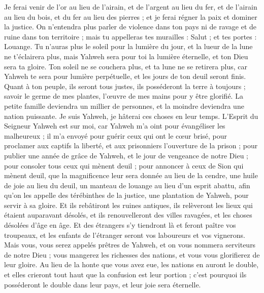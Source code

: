 \begin{multicols}{2}
Je ferai venir de l'or au lieu de l'airain, et de l'argent au lieu du fer, et de l'airain au lieu du bois, et du fer au lieu des pierres ; et je ferai régner la paix et dominer la justice.
On n'entendra plus parler de violence dans ton pays ni de ravage et de ruine dans ton territoire ; mais tu appelleras tes murailles : Salut ; et tes portes : Louange.
Tu n'auras plus le soleil pour la lumière du jour, et la lueur de la lune ne t'éclairera plus, mais Yahweh sera pour toi la lumière éternelle, et ton Dieu sera ta gloire.
Ton soleil ne se couchera plus, et ta lune ne se retirera plus, car Yahweh te sera pour lumière perpétuelle, et les jours de ton deuil seront finis.
Quant à ton peuple, ils seront tous justes, ils posséderont la terre à toujours ; savoir le germe de mes plantes, l'œuvre de mes mains pour y être glorifié.
La petite famille deviendra un millier de personnes, et la moindre deviendra une nation puissante. Je suis Yahweh, je hâterai ces choses en leur temps.
\VerseOne{}L'Esprit du Seigneur Yahweh est sur moi, car Yahweh m'a oint pour évangéliser les malheureux ; il m'a envoyé pour guérir ceux qui ont le cœur brisé, pour proclamer aux captifs la liberté, et aux prisonniers l'ouverture de la prison ;
pour publier une année de grâce de Yahweh, et le jour de vengeance de notre Dieu ; pour consoler tous ceux qui mènent deuil ;
pour annoncer à ceux de Sion qui mènent deuil, que la magnificence leur sera donnée au lieu de la cendre, une huile de joie au lieu du deuil, un manteau de louange au lieu d'un esprit abattu, afin qu'on les appelle des térébinthes de la justice, une plantation de Yahweh, pour servir à sa gloire.
Et ils rebâtiront les ruines antiques, ils relèveront les lieux qui étaient auparavant désolés, et ils renouvelleront des villes ravagées, et les choses désolées d'âge en âge.
Et des étrangers s'y tiendront là et feront paître vos troupeaux, et les enfants de l'étranger seront vos laboureurs et vos vignerons.
Mais vous, vous serez appelés prêtres de Yahweh, et on vous nommera serviteurs de notre Dieu ; vous mangerez les richesses des nations, et vous vous glorifierez de leur gloire.
Au lieu de la honte que vous avez eue, les nations en auront le double, et elles crieront tout haut que la confusion est leur portion ; c'est pourquoi ils posséderont le double dans leur pays, et leur joie sera éternelle.

\end{multicols}
